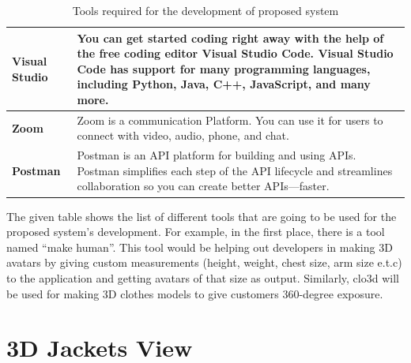 \begin{table}[H]
\begin{tabular}{ | m{7em} | m{11cm}|}
    \\  \hline
    \textbf{Visual Studio} & You can get started coding right away with the help of the free coding editor Visual Studio Code. Visual Studio Code has support for many programming languages, including Python, Java, C++, JavaScript, and many more.
    \\  \hline
    \textbf{  Zoom} & Zoom is a communication Platform. You can use it for users to connect with video, audio, phone, and chat.
       \\  \hline
    \textbf{Postman} & Postman is an API platform for building and using APIs. Postman simplifies each step of the API lifecycle and streamlines collaboration so you can create better APIs—faster.
    \\  \hline
\end{tabular}
    \caption{Tools required for the development of proposed system}
    \label{tab: Tools required for the development of proposed system}
\end{table}
The given table shows the list of different tools that are going to be used for the proposed system’s development. For example, in the first place, there is a tool named “make human”. This tool would be helping out developers in making 3D avatars by giving custom measurements (height, weight, chest size, arm size e.t.c) to the application and getting avatars of that size as output.  Similarly, clo3d will be used for making 3D clothes models to give customers 360-degree exposure. 
\section{3D Jackets View}
